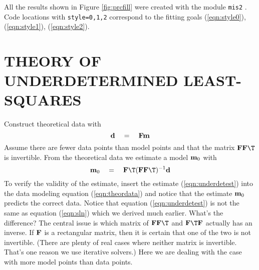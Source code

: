 All the results shown in Figure \ref{fig:prcfill}
were created with the module
\texttt{mis2} .
Code locations with \texttt{style=0,1,2}
correspond to the fitting goals
(\ref{eqn:style0}), (\ref{eqn:style1}), (\ref{eqn:style2}).
\par



\section{THEORY OF UNDERDETERMINED LEAST-SQUARES}
Construct theoretical data with
\begin{equation}
         \bold d \quad =\quad \bold F \bold m
        \label{eqn:theordata}
\end{equation}
Assume there are fewer data points than model points
and that the matrix $\bold F \bold F\T$ is invertible.
From the theoretical data we estimate a model $\bold m_0$ with
\begin{equation}
         \bold m_0 \eq \bold F\T (\bold F \bold F\T)^{-1} \bold d
        \label{eqn:underdetest}
\end{equation}
To verify the validity of the estimate,
insert the estimate (\ref{eqn:underdetest}) into the
data modeling equation (\ref{eqn:theordata}) and notice
that the estimate $\bold m_0$ predicts the correct data.
Notice that equation
(\ref{eqn:underdetest}) is not the same
as equation (\ref{eqn:sln}) which we derived much earlier.
What's the difference?
The central issue is which matrix of
$\bold F \bold F\T$ and
$\bold F\T \bold F$ actually has an inverse.
If $\bold F$ is a rectangular matrix,
then it is certain that one of the two is not invertible.
(There are plenty of real cases where neither matrix is invertible.
That's one reason we use iterative solvers.)
Here we are dealing with the case with more model points than data points.

